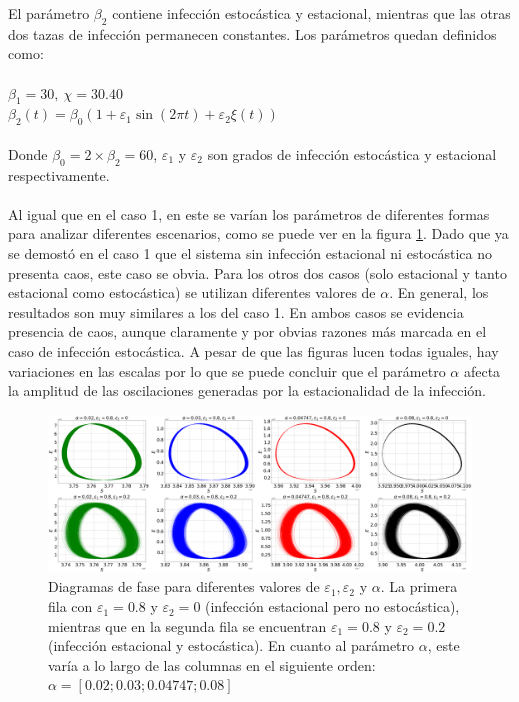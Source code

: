 \documentclass[conference]{IEEEtran}
\begin{document}
El parámetro $\beta_2$ contiene infección estocástica y estacional, mientras que las otras dos tazas de infección permanecen constantes. Los parámetros quedan definidos como:
\\\\
$\beta_1 = 30, \ \chi = 30.40$
\\
$\beta_2(t) = \beta_0(1+\varepsilon_1 \sin(2 \pi t) + \varepsilon_2 \xi(t))$
\\\\
Donde $\beta_0 = 2 \times \beta_2 = 60$, $\varepsilon_1$ y $\varepsilon_2$ son grados de infección estocástica y estacional respectivamente.
\\\\
Al igual que en el caso 1, en este se varían los parámetros de diferentes formas para analizar diferentes
escenarios, como se puede ver en la figura \ref{case_2}. Dado que ya se demostó en el caso 1 que el sistema sin infección estacional ni estocástica no 
presenta caos, este caso se obvia. Para los otros dos casos (solo estacional y tanto estacional como estocástica)
se utilizan diferentes valores de $\alpha$. En general, los resultados son muy similares a los del caso 1. 
En ambos casos se evidencia presencia de caos, aunque claramente y por obvias razones más marcada en el
caso de infección estocástica. A pesar de que las figuras lucen todas iguales, hay variaciones en las escalas
por lo que se puede concluir que el parámetro $\alpha$ afecta la amplitud de las oscilaciones generadas por 
la estacionalidad de la infección.

\begin{figure}[h]
    \centering
    \includegraphics[width=18cm]{../Figures/case_2.png}
    \caption{Diagramas de fase para diferentes valores de $\varepsilon_1, \varepsilon_2$ y $\alpha$. 
    La primera fila con $\varepsilon_1 = 0.8$ y $\varepsilon_2 = 0$ (infección estacional
    pero no estocástica), mientras que en la segunda fila se encuentran $\varepsilon_1 = 0.8$ y $\varepsilon_2 = 0.2$
    (infección estacional y estocástica). En cuanto al parámetro $\alpha$, este varía a lo largo de las
    columnas en el siguiente orden: $\alpha = [0.02 ; 0.03 ; 0.04747 ; 0.08]$}
    \label{case_2}
\end{figure}
\end{document}
